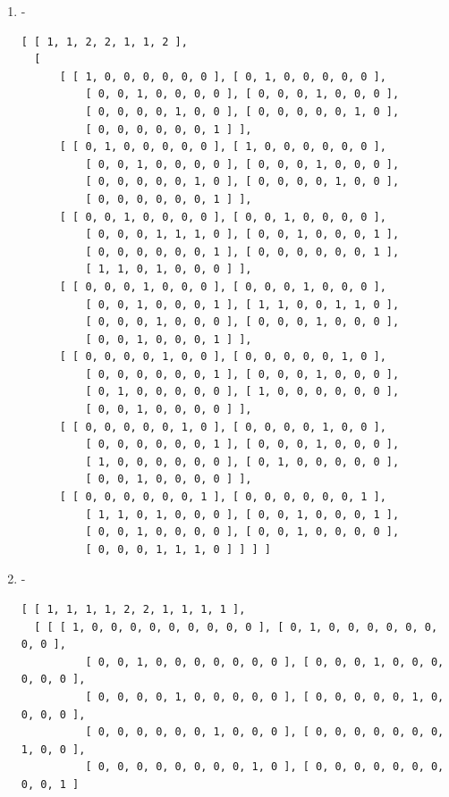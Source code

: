 \documentclass[a4paper, 10pt]{book}
\theoremstyle{definition}
\numberwithin{equation}{chapter}
\begin{document}
\begin{appendices}
\begin{enumerate}
\begin{lstlisting}[numbers=none]
          [ 0, 1, 0, 0, 0, 0, 0 ], [ 1, 0, 0, 0, 0, 0, 0 ], 
          [ 0, 0, 1, 0, 0, 0, 0 ] ], 
      [ [ 0, 0, 0, 0, 0, 0, 1 ], [ 0, 0, 0, 0, 0, 0, 1 ], 
          [ 1, 1, 0, 1, 0, 0, 0 ], [ 0, 0, 1, 0, 0, 0, 1 ], 
          [ 0, 0, 1, 0, 0, 0, 0 ], [ 0, 0, 1, 0, 0, 0, 0 ], 
          [ 0, 0, 0, 1, 1, 1, 0 ] ] ] ]
	\end{lstlisting}
	\item -\begin{lstlisting}[numbers=none]
	[ [ 1, 1, 2, 2, 1, 1, 2 ], 
  [ 
      [ [ 1, 0, 0, 0, 0, 0, 0 ], [ 0, 1, 0, 0, 0, 0, 0 ], 
          [ 0, 0, 1, 0, 0, 0, 0 ], [ 0, 0, 0, 1, 0, 0, 0 ], 
          [ 0, 0, 0, 0, 1, 0, 0 ], [ 0, 0, 0, 0, 0, 1, 0 ], 
          [ 0, 0, 0, 0, 0, 0, 1 ] ], 
      [ [ 0, 1, 0, 0, 0, 0, 0 ], [ 1, 0, 0, 0, 0, 0, 0 ], 
          [ 0, 0, 1, 0, 0, 0, 0 ], [ 0, 0, 0, 1, 0, 0, 0 ], 
          [ 0, 0, 0, 0, 0, 1, 0 ], [ 0, 0, 0, 0, 1, 0, 0 ], 
          [ 0, 0, 0, 0, 0, 0, 1 ] ], 
      [ [ 0, 0, 1, 0, 0, 0, 0 ], [ 0, 0, 1, 0, 0, 0, 0 ], 
          [ 0, 0, 0, 1, 1, 1, 0 ], [ 0, 0, 1, 0, 0, 0, 1 ], 
          [ 0, 0, 0, 0, 0, 0, 1 ], [ 0, 0, 0, 0, 0, 0, 1 ], 
          [ 1, 1, 0, 1, 0, 0, 0 ] ], 
      [ [ 0, 0, 0, 1, 0, 0, 0 ], [ 0, 0, 0, 1, 0, 0, 0 ], 
          [ 0, 0, 1, 0, 0, 0, 1 ], [ 1, 1, 0, 0, 1, 1, 0 ], 
          [ 0, 0, 0, 1, 0, 0, 0 ], [ 0, 0, 0, 1, 0, 0, 0 ], 
          [ 0, 0, 1, 0, 0, 0, 1 ] ], 
      [ [ 0, 0, 0, 0, 1, 0, 0 ], [ 0, 0, 0, 0, 0, 1, 0 ], 
          [ 0, 0, 0, 0, 0, 0, 1 ], [ 0, 0, 0, 1, 0, 0, 0 ], 
          [ 0, 1, 0, 0, 0, 0, 0 ], [ 1, 0, 0, 0, 0, 0, 0 ], 
          [ 0, 0, 1, 0, 0, 0, 0 ] ], 
      [ [ 0, 0, 0, 0, 0, 1, 0 ], [ 0, 0, 0, 0, 1, 0, 0 ], 
          [ 0, 0, 0, 0, 0, 0, 1 ], [ 0, 0, 0, 1, 0, 0, 0 ], 
          [ 1, 0, 0, 0, 0, 0, 0 ], [ 0, 1, 0, 0, 0, 0, 0 ], 
          [ 0, 0, 1, 0, 0, 0, 0 ] ], 
      [ [ 0, 0, 0, 0, 0, 0, 1 ], [ 0, 0, 0, 0, 0, 0, 1 ], 
          [ 1, 1, 0, 1, 0, 0, 0 ], [ 0, 0, 1, 0, 0, 0, 1 ], 
          [ 0, 0, 1, 0, 0, 0, 0 ], [ 0, 0, 1, 0, 0, 0, 0 ], 
          [ 0, 0, 0, 1, 1, 1, 0 ] ] ] ]
	\end{lstlisting}
	\item -\begin{lstlisting}[numbers=none]
	[ [ 1, 1, 1, 1, 2, 2, 1, 1, 1, 1 ], 
  [ [ [ 1, 0, 0, 0, 0, 0, 0, 0, 0, 0 ], [ 0, 1, 0, 0, 0, 0, 0, 0, 0, 0 ], 
          [ 0, 0, 1, 0, 0, 0, 0, 0, 0, 0 ], [ 0, 0, 0, 1, 0, 0, 0, 0, 0, 0 ],
          [ 0, 0, 0, 0, 1, 0, 0, 0, 0, 0 ], [ 0, 0, 0, 0, 0, 1, 0, 0, 0, 0 ],
          [ 0, 0, 0, 0, 0, 0, 1, 0, 0, 0 ], [ 0, 0, 0, 0, 0, 0, 0, 1, 0, 0 ],
          [ 0, 0, 0, 0, 0, 0, 0, 0, 1, 0 ], [ 0, 0, 0, 0, 0, 0, 0, 0, 0, 1 ] 

\end{lstlisting}
\end{enumerate}
\end{appendices}
\end{document}
